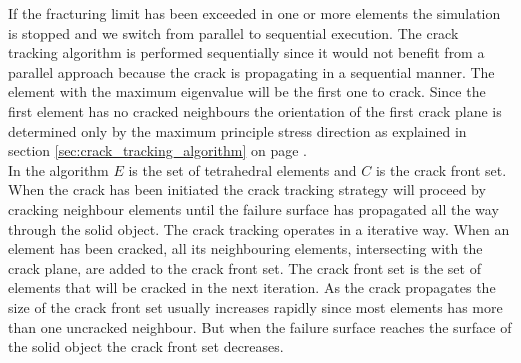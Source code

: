 If the fracturing limit has been exceeded in one or more elements the
simulation is stopped and we switch from parallel to sequential
execution. The crack tracking algorithm is performed sequentially
since it would not benefit from a parallel approach because the crack
is propagating in a sequential manner. The element with the maximum
eigenvalue will be the first one to crack. Since the first element has
no cracked neighbours the orientation of the first crack plane is  
determined only by the maximum principle stress direction as explained in
section \vref{sec:crack_tracking_algorithm} on page
\pageref{sec:crack_tracking_algorithm}. \\

In the algorithm $E$ is the set of tetrahedral elements and $C$ is the
crack front set. When the crack has been initiated the crack tracking
strategy will proceed by cracking neighbour elements until the failure
surface has propagated all the way through the solid object. The crack
tracking operates in a iterative way. When an element has been
cracked, all its neighbouring elements, intersecting with the crack
plane, are added to the crack front set. The crack front set is the
set of elements that will be cracked in the next iteration. As the
crack propagates the size of the crack front set usually increases
rapidly since most elements has more than one uncracked neighbour. But
when the failure surface reaches the surface of the solid object the
crack front set decreases. \\ 

